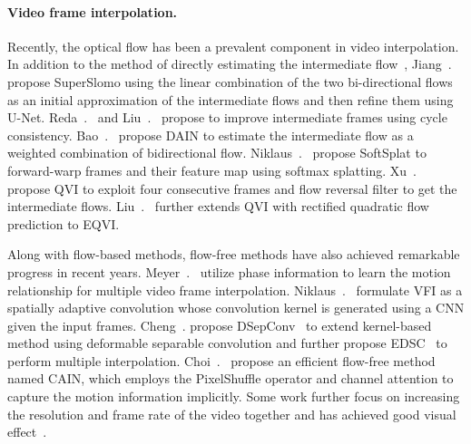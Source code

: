 \documentclass[final]{cvpr}
\begin{document}
\paragraph{Video frame interpolation.} Recently, the optical flow has been a prevalent component in video interpolation. In addition to the method of directly estimating the intermediate flow~\cite{liu2017video, lee2020adacof, park2020bmbc}, Jiang~\etal.~\cite{jiang2018super} propose SuperSlomo using the linear combination of the two bi-directional flows as an initial approximation of the intermediate flows and then refine them using U-Net. Reda~\etal.~\cite{reda2019unsupervised} and Liu~\etal.~\cite{liu2019deep} propose to improve intermediate frames using cycle
consistency. Bao~\etal.~\cite{bao2019depth} propose DAIN to estimate the intermediate flow as a weighted combination of bidirectional flow. Niklaus~\etal.~\cite{niklaus2020softmax} propose SoftSplat to forward-warp frames and their feature map using softmax splatting. Xu~\etal.~\cite{xu2019quadratic} propose QVI to exploit four consecutive frames and flow reversal filter to get the intermediate flows. Liu~\etal.~\cite{liu2020enhanced} further extends QVI with rectified quadratic flow prediction to EQVI. 

Along with flow-based methods, flow-free methods have also achieved remarkable progress in recent years. Meyer~\etal.~\cite{meyer2015phase,meyer2018phasenet} utilize phase information to learn the motion relationship for multiple video frame interpolation. Niklaus~\etal.~\cite{niklaus2017video, Niklaus_ICCV_2017} formulate VFI as a spatially adaptive convolution whose convolution kernel is generated using a CNN given the input frames. Cheng~\etal. propose DSepConv~\cite{cheng2020video} to extend kernel-based method using deformable separable convolution and further propose EDSC~\cite{cheng2020multiple} to perform multiple interpolation. Choi~\etal.~\cite{choi2020channel} propose an efficient flow-free method named CAIN, which employs the PixelShuffle operator and channel attention to capture the motion information implicitly. Some work further 
focus on increasing the resolution and frame rate of the video together and has achieved good visual effect~\cite{xiang2020zooming, xu2021temporal}.
\end{document}
